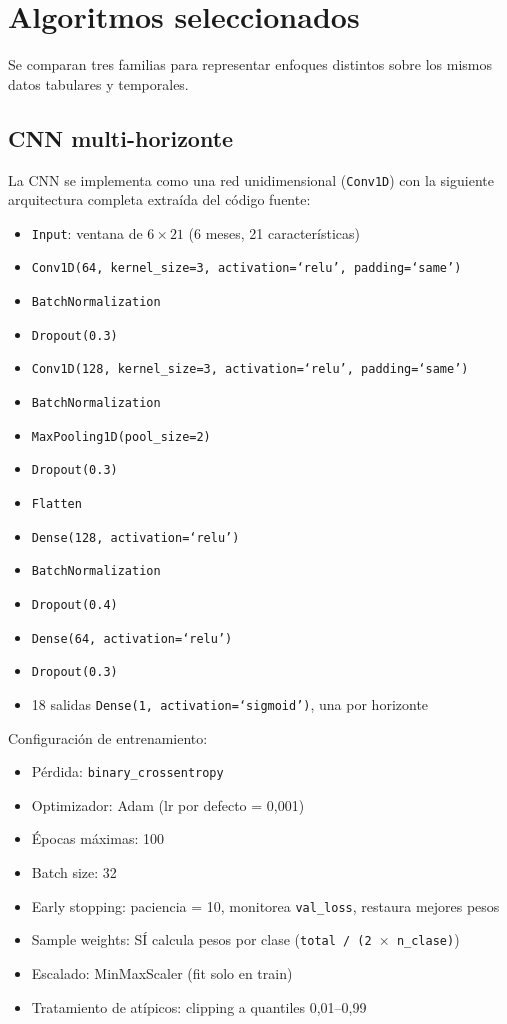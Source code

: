 \section{Algoritmos seleccionados}

Se comparan tres familias para representar enfoques distintos sobre los mismos datos tabulares y temporales.

\subsection{CNN multi-horizonte}

La CNN se implementa como una red unidimensional (\texttt{Conv1D}) con la siguiente arquitectura completa extraída del código fuente:

\begin{itemize}
    \item \texttt{Input}: ventana de $6 \times 21$ (6 meses, 21 características)
    \item \texttt{Conv1D(64, kernel\_size=3, activation=`relu', padding=`same')}
    \item \texttt{BatchNormalization}
    \item \texttt{Dropout(0.3)}
    \item \texttt{Conv1D(128, kernel\_size=3, activation=`relu', padding=`same')}
    \item \texttt{BatchNormalization}
    \item \texttt{MaxPooling1D(pool\_size=2)}
    \item \texttt{Dropout(0.3)}
    \item \texttt{Flatten}
    \item \texttt{Dense(128, activation=`relu')}
    \item \texttt{BatchNormalization}
    \item \texttt{Dropout(0.4)}
    \item \texttt{Dense(64, activation=`relu')}
    \item \texttt{Dropout(0.3)}
    \item 18 salidas \texttt{Dense(1, activation=`sigmoid')}, una por horizonte
\end{itemize}

Configuración de entrenamiento:

\begin{itemize}
    \item Pérdida: \texttt{binary\_crossentropy}
    \item Optimizador: Adam (lr por defecto = 0,001)
    \item Épocas máximas: 100
    \item Batch size: 32
    \item Early stopping: paciencia = 10, monitorea \texttt{val\_loss}, restaura mejores pesos
    \item Sample weights: SÍ calcula pesos por clase (\texttt{total / (2 $\times$ n\_clase)})
    \item Escalado: MinMaxScaler (fit solo en train)
    \item Tratamiento de atípicos: clipping a quantiles 0,01--0,99
\end{itemize}

